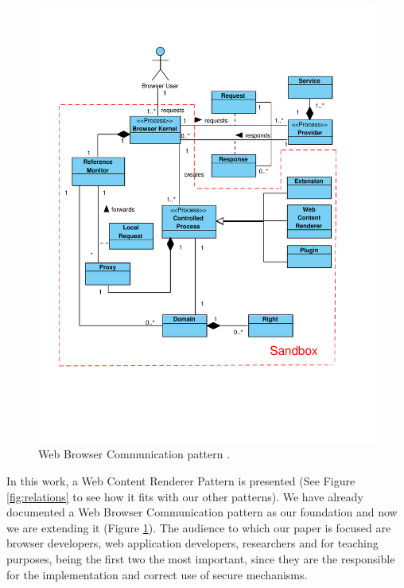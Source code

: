 \documentclass[prodmode,acmtecs]{acmsmall}
\begin{document}
    \begin{figure}[h!t]
      \vspace*{-1cm}
      \centering
      \includegraphics[scale=0.6]{figures/BrowserInfrastructure-v3.pdf}
      \vspace*{-2.3cm}
      \caption{Web Browser Communication pattern \cite{silva2015}.}
      \label{fig:WBCP}
    \end{figure}

In this work, a Web Content Renderer Pattern is presented (See Figure \ref{fig:relations} to see how it fits with our other patterns). We have already documented a Web Browser Communication pattern as our foundation and now we are extending it \cite{silva2015} (Figure \ref{fig:WBCP}). The audience to which our paper is focused are browser developers, web application developers, researchers and for teaching purposes, being the first two the most important, since they are the responsible for the implementation and correct use of secure mechanisms. 
\end{document}
